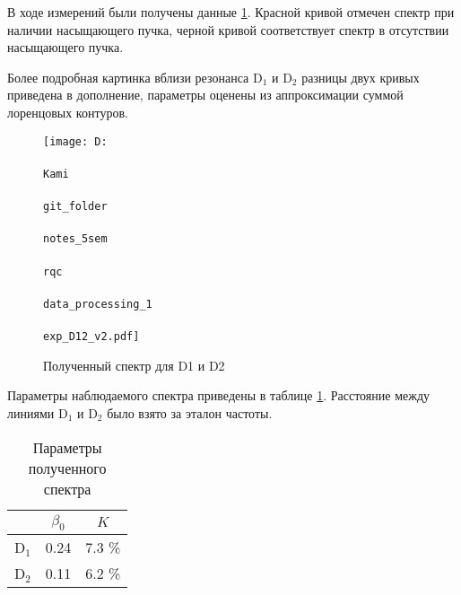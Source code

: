 В ходе измерений были получены данные \ref{fig:expD12}. Красной кривой отмечен спектр при наличии насыщающего пучка, черной кривой соответствует спектр в отсутствии насыщающего пучка. 

Более подробная картинка вблизи резонанса D${}_1$ и D${}_2$ разницы двух кривых приведена в дополнение, параметры оценены из аппроксимации суммой лоренцовых контуров. 


\begin{figure}[h]
    \centering
    \texttt{[image: D:\\\\Kami\\\\git\_folder\\\\notes\_5sem\\\\rqc\\\\data\_processing\_1\\\\exp\_D12\_v2.pdf]}
    \caption{Полученный спектр для D1 и D2}
    \label{fig:expD12}
\end{figure}


Параметры наблюдаемого спектра приведены в таблице \ref{tab:params1}.
Расстояние между линиями D$_1$ и D$_2$ было взято за эталон частоты.

\begin{table}[h]
    \centering
    \caption{Параметры полученного спектра}
    \begin{tabular}{c|cc}
    \toprule
       & $\beta_0$ & $K$  \\
   \midrule
    D$_1$ & 0.24 & 7.3 \% \\
    D$_2$ & 0.11 & 6.2 \% \\
    \bottomrule
    \end{tabular}
    \label{tab:params1}
\end{table}



